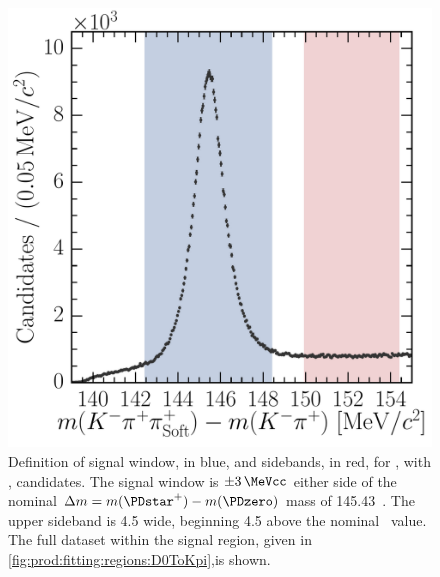 \begin{figure}
  \centering
  \includegraphics[width=\textwidth]{figures/production/fitting/DstToD0pi_D0ToKpi_delta_mass_offline_selection_regions}
  \caption{%
    Definition of signal window, in blue, and sidebands, in red, for 
    \DstToDzpi, with \DzToKpi, candidates.
    The signal window is $\pm\SI{3}{\MeVcc}$ either side of the nominal 
    $\deltam = m(\PDstarp) - m(\PDzero)$ mass of 
    \SI{145.43}{\MeVcc}~\cite{PDG2014}.
    The upper sideband is \SI{4.5}{\MeVcc} wide, beginning \SI{4.5}{\MeVcc} 
    above the nominal \deltam\ value.
    The full dataset within the \PDzero signal region, given in 
    \cref{fig:prod:fitting:regions:D0ToKpi},is shown.
  }
  \label{fig:prod:fitting:regions:DstToD0pi_D0ToKpi}
\end{figure}

